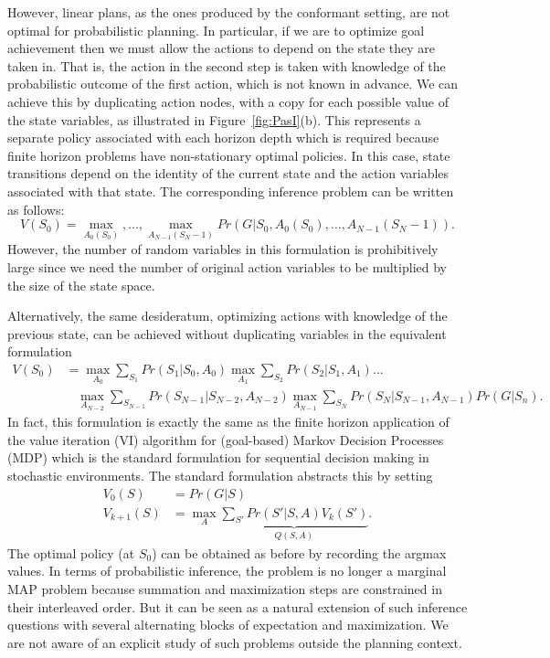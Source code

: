 However, linear plans, as the ones produced by the conformant setting, are not optimal for probabilistic planning. In
particular, if we are to optimize goal achievement then we must allow
the actions to depend on the state they are taken in. That is, the
action in the second step is taken with knowledge of the probabilistic
outcome of the first action, which is not known in advance. 
We can achieve this by duplicating action nodes, with a copy for each possible value of the state variables, as illustrated in 
Figure~\ref{fig:PasI}(b). This represents a separate policy associated with each horizon depth which is required because finite horizon problems have non-stationary optimal policies.
In this case, state transitions depend on the identity of the current state and the action variables associated with that state. 
%
%
%
%
%
%
%
%
%
%
%
%
%
%
%
%
%
The corresponding inference problem can
be written as follows:
\begin{equation}
\label{eq:VoptV1}
V(S_0) = \max_{A_0(S_0)}, \ldots, \max_{A_{N-1}(S_N-1)} Pr(G | S_0, A_0(S_0), \ldots, A_{N-1} (S_N-1 ) ). 
\end{equation}
However, the number of random variables in this formulation is
prohibitively large since we need the number of original action variables to be multiplied by the size of the state space. 

Alternatively, the same desideratum, optimizing
actions with knowledge of the previous state, can be achieved without
duplicating variables in the equivalent formulation
\begin{align}
V(S_0) &  = 
\max_{A_0}
\sum_{S_1}
Pr(S_{1}|S_{0},A_{0})
\max_{A_1}
\sum_{S_2}
Pr(S_{2}|S_{1},A_{1})
\ldots
\nonumber
\\
& \ \ \ \ 
\max_{A_{N-2}}
\sum_{S_{N-1}}
Pr(S_{N-1}|S_{N-2},A_{N-2})
\max_{A_{N-1}}
\sum_{S_N}
Pr(S_N|S_{N-1},A_{N-1})
Pr(G|S_n). 
\label{eq:VoptV2}
\end{align}
In fact, this formulation is exactly the same as the finite horizon
application of the value iteration (VI) algorithm for (goal-based) Markov Decision
Processes (MDP) which is the standard formulation for sequential decision
making in stochastic environments.  The standard formulation abstracts
this by setting 
\begin{align}
V_0(S) & = Pr(G|S) 
\nonumber
\\
V_{k+1}(S) & =  
\max_{A}
\underbrace{\sum_{S'} Pr(S'|S,A) V_k(S')}_{Q(S,A)}.
\label{eq:VI} 
\end{align}
The optimal policy (at $S_0$) can be obtained as before by recording
the argmax values.  In terms of probabilistic inference, the problem
is no longer a marginal MAP problem because summation and maximization steps are
constrained in their interleaved order. But it can be seen as a natural extension of such inference questions with several alternating blocks of expectation and maximization.
We are not aware of an explicit study of such problems outside the planning context.


